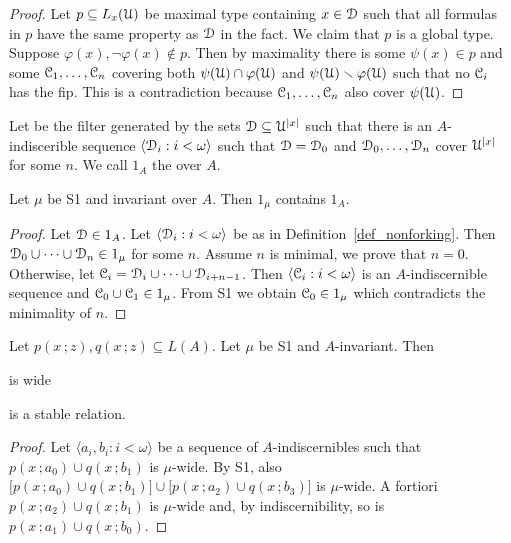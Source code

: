 \documentclass{amsproc}
\renewcommand*{\emph}[1]{%
   \smash{\tikz[baseline]\node[rectangle, fill=teal!25, rounded corners, inner xsep=0.5ex, inner ysep=0.2ex, anchor=base, minimum height = 2.7ex]{\strut #1};}}
\begin{document}
\begin{proof}
  Let $p\subseteq L_x(\EuScript U)$ be maximal type containing $x\in\EuScript D$ such that all formulas in $p$ have the same property as $\EuScript D$ in the fact.
  We claim that $p$ is a global type.
  Suppose $\varphi(x),\neg\varphi(x)\notin p$.
  Then by maximality there is some $\psi(x)\in p$ and some $\EuScript C_1,\dots,\EuScript C_n$ covering both $\psi(\EuScript U)\cap\varphi(\EuScript U)$ and $\psi(\EuScript U)\smallsetminus\varphi(\EuScript U)$ such that no $\EuScript C_i$ has the fip.
  This is a contradiction because $\EuScript C_1,\dots,\EuScript C_n$ also cover $\psi(\EuScript U)$.
\end{proof}

\begin{definition}\label{def_nonforking}
  Let \emph{$1_A$\/} be the filter generated by the sets $\EuScript D\subseteq\EuScript U^{|x|}$ such that there is an $A$-indiscerible sequence $\langle \EuScript D_i:i<\omega\rangle$ such that $\EuScript D=\EuScript D_0$ and $\EuScript D_0,\dots,\EuScript D_n$ cover $\EuScript U^{|x|}$ for some $n$.
  We call $1_A$ the \emph{nonforking filter\/} over $A$.
\end{definition}

\begin{fact}
  Let $\mu$ be S1 and invariant over $A$.
  Then $1_\mu$ contains $1_A$.
\end{fact}

\begin{proof}
  Let $\EuScript D\in 1_A$. 
  Let $\langle \EuScript D_i:i<\omega\rangle$ be as in Definition~\ref{def_nonforking}.
  Then $\EuScript D_0\cup\dots\cup\EuScript D_n\in1_\mu$ for some $n$.
  Assume $n$ is minimal, we prove that $n=0$.
  Otherwise, let $\EuScript C_i=\EuScript D_i\cup\dots\cup\EuScript D_{i+n-1}$.
  Then $\langle \EuScript C_i:i<\omega\rangle$ is an $A$-indiscernible sequence and $\EuScript C_0\cup\EuScript C_1\in1_\mu$.
  From S1 we obtain $\EuScript C_0\in1_\mu$ which contradicts the minimality of $n$.
\end{proof}

\begin{theorem}
  Let $p(x\,;z), q(x\,;z)\subseteq L(A)$.
  Let $\mu$ be S1 and $A$-invariant.
  Then 

   is wide

  is a stable relation.
\end{theorem}

\begin{proof}
  Let $\langle a_i,b_i: i<\omega\rangle$ be a sequence of $A$-indiscernibles such that $p(x\,;a_0)\cup q(x\,;b_1)$ is $\mu$-wide.
  By S1, also $\big[p(x\,;a_0)\cup q(x\,;b_1)\big]\cup\big[p(x\,;a_2)\cup q(x\,;b_3)\big]$ is $\mu$-wide.
  A fortiori $p(x\,;a_2)\cup q(x\,;b_1)$ is $\mu$-wide and, by indiscernibility, so is $p(x\,;a_1)\cup q(x\,;b_0)$.
\end{proof}
\end{document}
